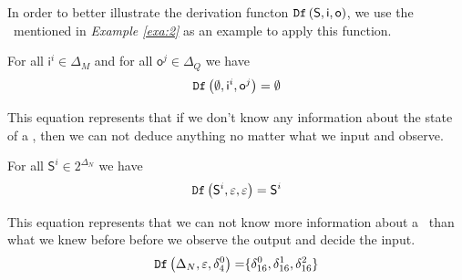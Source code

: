  
\begin{example}
 In order to better illustrate the derivation functon ${\tt Df}\left( \mathsf{S},  \mathsf{i},  \mathsf{o}\right)$, we use the \BCN\ mentioned in {\em Example \ref{exa:2}} as an example to apply this function. %
 
 For all $\mathsf{i}^{i}\in \Delta_M$ and for all $\mathsf{o}^{j}\in \Delta_Q$ we have 
\begin{equation*}
\begin{split}
{\tt Df}\left(\emptyset,\mathsf{i}^{i},\mathsf{o}^{j}\right)=\emptyset\\
\end{split}
\label{equ:7}
\end{equation*}

This equation represents that 
if we don't know any information about the state of a \BCN, then we can not deduce anything no matter what we input and observe.

For all $\mathsf{S}^{i}\in 2^{\Delta_N}$ we have 
\begin{equation*}
\begin{split}
{\tt Df}\left(\mathsf{S}^{i},\varepsilon,\varepsilon\right)=\mathsf{S}^{i}\\
\end{split}
\label{equ:8}
\end{equation*}

 This equation represents that %
 we can not know more information about a \BCN\ than what we knew before before we observe the output and decide the input.
\begin{equation*}
\begin{split}
{\tt Df}\left(\Delta_N,\varepsilon,\delta_4^0\right)=&\{\delta_{16}^0,\delta_{16}^1,\delta_{16}^2\}\\
\end{split}
\label{equ:9}
\end{equation*}
 

\end{example}
